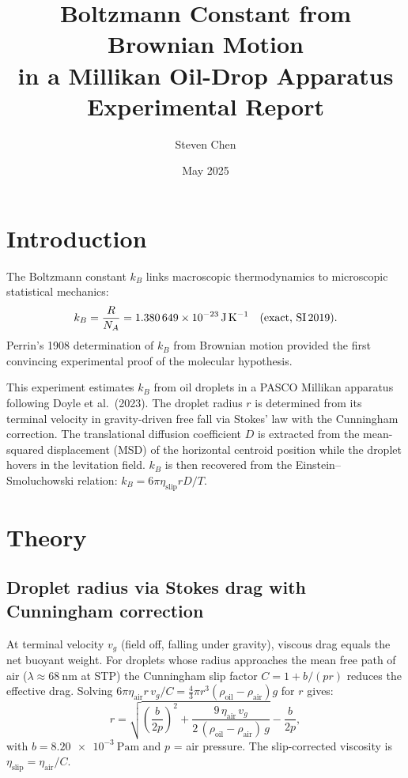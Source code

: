 \documentclass[12pt,a4paper]{article}
\title{\textbf{Boltzmann Constant from Brownian Motion\\in a Millikan Oil-Drop Apparatus}\\[6pt]
\large Experimental Report}
\author{Steven Chen}
\date{May 2025}
\begin{document}
\maketitle
\tableofcontents
\newpage

\section{Introduction}

The Boltzmann constant $k_B$ links macroscopic thermodynamics to microscopic
statistical mechanics:
\begin{equation}
  k_B = \frac{R}{N_A} = \SI{1.380649e-23}{\joule\per\kelvin}
  \quad\text{(exact, SI\,2019)}.
\end{equation}
Perrin's 1908 determination of $k_B$ from Brownian motion provided the first
convincing experimental proof of the molecular hypothesis.

This experiment estimates $k_B$ from oil droplets in a PASCO Millikan
apparatus following Doyle et al.~(2023).  The droplet radius $r$ is determined
from its terminal velocity in gravity-driven free fall via Stokes' law with
the Cunningham correction.  The translational diffusion coefficient $D$ is
extracted from the mean-squared displacement (MSD) of the horizontal centroid
position while the droplet hovers in the levitation field.  $k_B$ is then
recovered from the Einstein--Smoluchowski relation:
$k_B = 6\pi\eta_\text{slip}rD/T$.

\section{Theory}

\subsection{Droplet radius via Stokes drag with Cunningham correction}

At terminal velocity $v_g$ (field off, falling under gravity), viscous drag
equals the net buoyant weight.  For droplets whose radius approaches the mean
free path of air ($\lambda\approx\SI{68}{\nano\metre}$ at STP) the Cunningham
slip factor $C=1+b/(pr)$ reduces the effective drag.  Solving
$6\pi\eta_\text{air}r\,v_g/C = \tfrac{4}{3}\pi r^3(\rho_\text{oil}-\rho_\text{air})g$
for $r$ gives:
\begin{equation}
  r = \sqrt{\left(\frac{b}{2p}\right)^{\!2}
      + \frac{9\,\eta_\text{air}\,v_g}{2\,(\rho_\text{oil}-\rho_\text{air})\,g}}
      - \frac{b}{2p},
  \label{eq:radius}
\end{equation}
with $b=\SI{8.20e-3}{\pascal\metre}$ and $p$ = air pressure.
The slip-corrected viscosity is $\eta_\text{slip}=\eta_\text{air}/C$.
\end{document}
